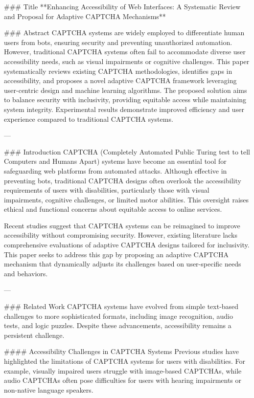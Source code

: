 ### Title
**Enhancing Accessibility of Web Interfaces: A Systematic Review and Proposal for Adaptive CAPTCHA Mechanisms**

### Abstract
CAPTCHA systems are widely employed to differentiate human users from bots, ensuring security and preventing unauthorized automation. However, traditional CAPTCHA systems often fail to accommodate diverse user accessibility needs, such as visual impairments or cognitive challenges. This paper systematically reviews existing CAPTCHA methodologies, identifies gaps in accessibility, and proposes a novel adaptive CAPTCHA framework leveraging user-centric design and machine learning algorithms. The proposed solution aims to balance security with inclusivity, providing equitable access while maintaining system integrity. Experimental results demonstrate improved efficiency and user experience compared to traditional CAPTCHA systems.

---

### Introduction
CAPTCHA (Completely Automated Public Turing test to tell Computers and Humans Apart) systems have become an essential tool for safeguarding web platforms from automated attacks. Although effective in preventing bots, traditional CAPTCHA designs often overlook the accessibility requirements of users with disabilities, particularly those with visual impairments, cognitive challenges, or limited motor abilities. This oversight raises ethical and functional concerns about equitable access to online services.

Recent studies suggest that CAPTCHA systems can be reimagined to improve accessibility without compromising security. However, existing literature lacks comprehensive evaluations of adaptive CAPTCHA designs tailored for inclusivity. This paper seeks to address this gap by proposing an adaptive CAPTCHA mechanism that dynamically adjusts its challenges based on user-specific needs and behaviors.

---

### Related Work
CAPTCHA systems have evolved from simple text-based challenges to more sophisticated formats, including image recognition, audio tests, and logic puzzles. Despite these advancements, accessibility remains a persistent challenge. 

#### Accessibility Challenges in CAPTCHA Systems
Previous studies have highlighted the limitations of CAPTCHA systems for users with disabilities. For example, visually impaired users struggle with image-based CAPTCHAs, while audio CAPTCHAs often pose difficulties for users with hearing impairments or non-native language speakers.

